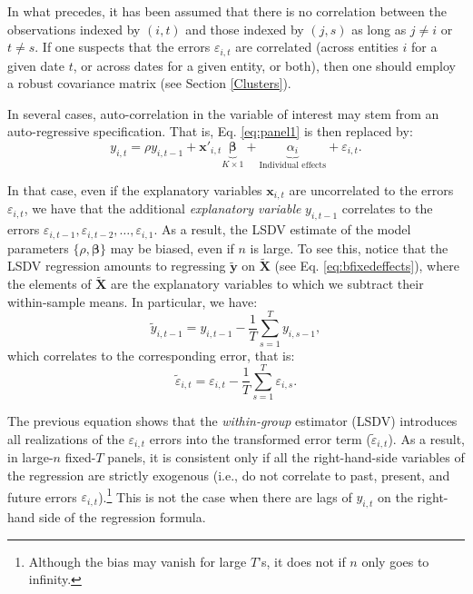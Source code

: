 \documentclass[
  12pt,
]{book}
\theoremstyle{definition}
\theoremstyle{definition}
\theoremstyle{definition}
\theoremstyle{definition}
\theoremstyle{remark}
\begin{document}
In what precedes, it has been assumed that there is no correlation between the observations indexed by \((i,t)\) and those indexed by \((j,s)\) as long as \(j \ne i\) or \(t \ne s\). If one suspects that the errors \(\varepsilon_{i,t}\) are correlated (across entities \(i\) for a given date \(t\), or across dates for a given entity, or both), then one should employ a robust covariance matrix (see Section \ref{Clusters}).

In several cases, auto-correlation in the variable of interest may stem from an auto-regressive specification. That is, Eq. \eqref{eq:panel1} is then replaced by:
\begin{equation}
y_{i,t} = \rho y_{i,t-1} + \mathbf{x}'_{i,t}\underbrace{\boldsymbol\beta}_{K \times 1} + \underbrace{\alpha_i}_{\mbox{Individual effects}} + \varepsilon_{i,t}.\label{eq:paneldyn}
\end{equation}

In that case, even if the explanatory variables \(\mathbf{x}_{i,t}\) are uncorrelated to the errors \(\varepsilon_{i,t}\), we have that the additional \emph{explanatory variable} \(y_{i,t-1}\) correlates to the errors \(\varepsilon_{i,t-1},\varepsilon_{i,t-2},\dots,\varepsilon_{i,1}\). As a result, the LSDV estimate of the model parameters \(\{\rho,\boldsymbol\beta\}\) may be biased, even if \(n\) is large. To see this, notice that the LSDV regression amounts to regressing \(\widetilde{\mathbf{y}}\) on \(\widetilde{\mathbf{X}}\) (see Eq. \eqref{eq:bfixedeffects}), where the elements of \(\widetilde{\mathbf{X}}\) are the explanatory variables to which we subtract their within-sample means. In particular, we have:
\[
\tilde{y}_{i,t-1} = y_{i,t-1} - \frac{1}{T} \sum_{s=1}^{T} y_{i,s-1},
\]
which correlates to the corresponding error, that is:
\[
\tilde{\varepsilon}_{i,t} = \varepsilon_{i,t} - \frac{1}{T} \sum_{s=1}^{T} \varepsilon_{i,s}.
\]

The previous equation shows that the \emph{within-group} estimator (LSDV) introduces all realizations of the \(\varepsilon_{i,t}\) errors into the transformed error term (\(\tilde{\varepsilon}_{i,t}\)). As a result, in large-\(n\) fixed-\(T\) panels, it is consistent only if all the right-hand-side variables of the regression are strictly exogenous (i.e., do not correlate to past, present, and future errors \(\varepsilon_{i,t}\)).\footnote{Although the bias may vanish for large \(T\)'s, it does not if \(n\) only goes to infinity.} This is not the case when there are lags of \(y_{i,t}\) on the right-hand side of the regression formula.
\end{document}
